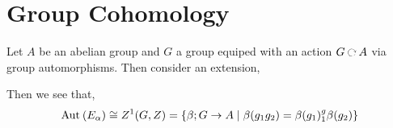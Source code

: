 \documentclass[12pt]{article}
\begin{document}
\section{Group Cohomology}

Let $A$ be an abelian group and $G$ a group equiped with an action $G \acts A$ via group automorphisms. Then consider an extension,
\begin{center}
\end{center}
Then we see that,
\[ \mathrm{Aut}_{} \left( E_\alpha \right) \cong Z^1(G, Z) = \{ \beta ; G \to A \mid \beta(g_1 g_2) = \beta(g_1) {}^g_1 \beta(g_2) \} \]
\end{document}
